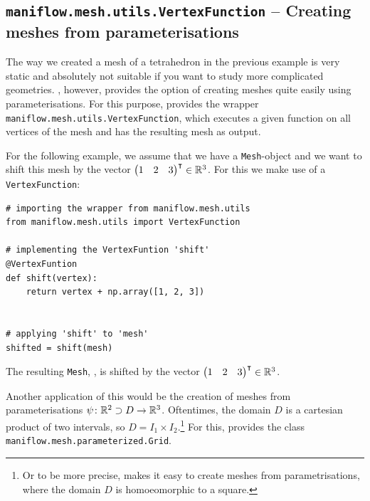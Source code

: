 \subsection{\texttt{maniflow.mesh.utils.VertexFunction} -- Creating meshes from parameterisations}
The way we created a mesh of a tetrahedron in the previous example is very static and absolutely not suitable if you want to study more complicated geometries. \maniflow{}, however, provides the option of creating meshes quite easily using parameterisations. For this purpose, \maniflow{} provides the wrapper \texttt{maniflow.mesh.utils.VertexFunction}, which executes a given function on all vertices of the mesh and has the resulting mesh as output.
\begin{ex}
    For the following example, we assume that we have a \texttt{Mesh}-object  and we want to shift this mesh by the vector $\begin{pmatrix}1 & 2 & 3\end{pmatrix}^{\intercal}\in\mathbb{R}^3$. For this we make use of a \texttt{VertexFunction}:
    \begin{lstlisting}
# importing the wrapper from maniflow.mesh.utils
from maniflow.mesh.utils import VertexFunction

# implementing the VertexFuntion 'shift'
@VertexFuntion
def shift(vertex):
    return vertex + np.array([1, 2, 3])


# applying 'shift' to 'mesh'
shifted = shift(mesh)
    \end{lstlisting}
    The resulting \texttt{Mesh}, , is  shifted by the vector $\begin{pmatrix}1 & 2 & 3\end{pmatrix}^{\intercal}\in\mathbb{R}^3$.
\end{ex}
Another application of this would be the creation of meshes from parameterisations $\psi\colon \mathbb{R}^2\supset D\to\mathbb{R}^3$. Oftentimes, the domain $D$ is a cartesian product of two intervals, so $D = I_1\times I_2$.\footnote{Or to be more precise, \maniflow{} makes it easy to create meshes from parametrisations, where the domain $D$ is homoeomorphic to a square.} For this, \maniflow{} provides the class \texttt{maniflow.mesh.parameterized.Grid}.
